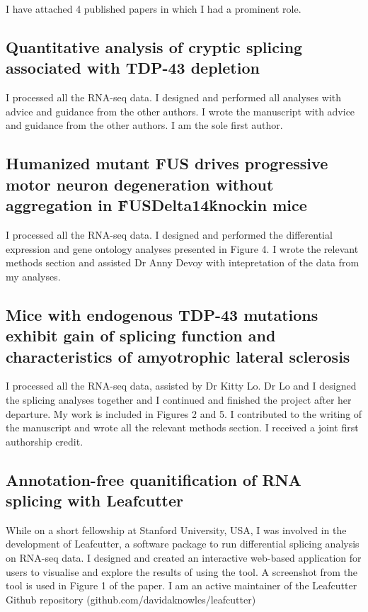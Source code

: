\begin{appendices}
I have attached 4 published papers in which I had a prominent role.


\subsection*{Quantitative analysis of cryptic splicing associated with TDP-43 depletion}

I processed all the RNA-seq data. I designed and performed all analyses with advice and guidance from the other authors. I wrote the manuscript with advice and guidance from the other authors. I am the sole first author.



\subsection*{Humanized mutant FUS drives progressive motor neuron degeneration without aggregation in \'FUSDelta14\' knockin mice}

I processed all the RNA-seq data. I designed and performed the differential expression and gene ontology analyses presented in Figure 4. I wrote the relevant methods section and assisted Dr Anny Devoy with intepretation of the data from my analyses.



\subsection*{Mice with endogenous TDP-43 mutations exhibit gain of splicing function and characteristics of amyotrophic lateral sclerosis}

I processed all the RNA-seq data, assisted by Dr Kitty Lo. Dr Lo and I designed the splicing analyses together and I continued and finished the project after her departure. My work is included in Figures 2 and 5. I contributed to the writing of the manuscript and wrote all the relevant methods section. I received a joint first authorship credit.



\subsection*{Annotation-free quanitification of RNA splicing with Leafcutter}

While on a short fellowship at Stanford University, USA, I was involved in the development of Leafcutter, a software package to run differential splicing analysis on RNA-seq data. I designed and created an interactive web-based application for users to visualise and explore the results of using the tool. A screenshot from the tool is used in Figure 1 of the paper. I am an active maintainer of the Leafcutter Github repository (github.com/davidaknowles/leafcutter)


\end{appendices}
